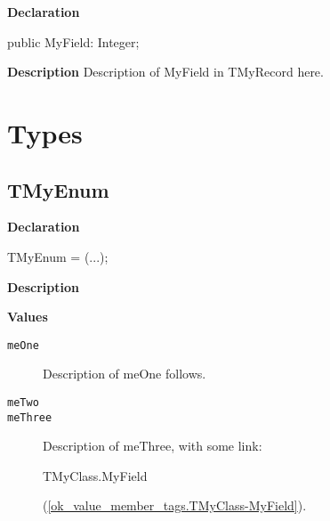 \documentclass{report}
\begin{document}
\begin{list}{}{
\setlength{\itemindent}{0cm}
\setlength{\listparindent}{0cm}
\setlength{\leftmargin}{\evensidemargin}
\addtolength{\leftmargin}{\tmplength}
\settowidth{\labelsep}{X}
\addtolength{\leftmargin}{\labelsep}
\setlength{\labelwidth}{\tmplength}
}
\begin{flushleft}
\item[\textbf{Declaration}\hfill]
\begin{ttfamily}
public MyField: Integer;\end{ttfamily}


\end{flushleft}
\par
\item[\textbf{Description}]
Description of MyField in TMyRecord here.

\end{list}
\section{Types}
\subsection*{TMyEnum}
\begin{list}{}{
\setlength{\itemindent}{0cm}
\setlength{\listparindent}{0cm}
\setlength{\leftmargin}{\evensidemargin}
\addtolength{\leftmargin}{\tmplength}
\settowidth{\labelsep}{X}
\addtolength{\leftmargin}{\labelsep}
\setlength{\labelwidth}{\tmplength}
}
\begin{flushleft}
\item[\textbf{Declaration}\hfill]
\begin{ttfamily}
TMyEnum = (...);\end{ttfamily}


\end{flushleft}
\par
\item[\textbf{Description}]
 \item[\textbf{Values}]
\begin{description}
\item[\texttt{meOne}] Description of meOne follows.
\item[\texttt{meTwo}]  
\item[\texttt{meThree}] Description of meThree, with some link: \begin{ttfamily}TMyClass.MyField\end{ttfamily}(\ref{ok_value_member_tags.TMyClass-MyField}).
\end{description}


\end{list}
\end{document}
